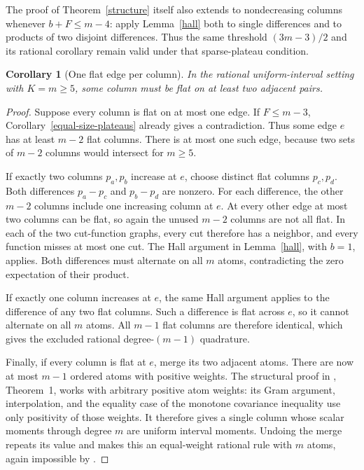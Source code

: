 \documentclass[11pt]{article}
\newtheorem{corollary}[theorem]{Corollary}
\begin{document}
The proof of Theorem~\ref{structure} itself also extends to nondecreasing
columns whenever $b+F\le m-4$: apply Lemma~\ref{hall} both to single
differences and to products of two disjoint differences. Thus the same
threshold $(3m-3)/2$ and its rational corollary remain valid under that
sparse-plateau condition.

\begin{corollary}[One flat edge per column]\label{one-flat}
In the rational uniform-interval setting with $K=m\ge5$, some column
must be flat on at least two adjacent pairs.
\end{corollary}
\begin{proof}
Suppose every column is flat on at most one edge. If $F\le m-3$,
Corollary~\ref{equal-size-plateaus} already gives a contradiction.
Thus some edge $e$ has at least $m-2$ flat columns. There is at most one
such edge, because two sets of $m-2$ columns would intersect for $m\ge5$.

If exactly two columns $p_a,p_b$ increase at $e$, choose distinct flat
columns $p_c,p_d$. Both differences $p_a-p_c$ and $p_b-p_d$ are nonzero.
For each difference, the other $m-2$ columns include one increasing
column at $e$. At every other edge at most two columns can be flat,
so again the unused $m-2$ columns are not all flat.
In each of the two cut-function graphs, every cut therefore has a
neighbor, and every function misses at most one cut. The Hall argument
in Lemma~\ref{hall}, with $b=1$, applies. Both differences must alternate
on all $m$ atoms, contradicting the zero expectation of their product.

If exactly one column increases at $e$, the same Hall argument applies
to the difference of any two flat columns. Such a difference is flat
across $e$, so it cannot alternate on all $m$ atoms. All $m-1$ flat
columns are therefore identical, which gives the excluded rational
degree-$(m-1)$ quadrature.

Finally, if every column is flat at $e$, merge its two adjacent atoms.
There are now at most $m-1$ ordered atoms with positive weights.
The structural proof in , Theorem~1,
works with arbitrary positive atom weights: its Gram argument,
interpolation, and the equality case of the monotone covariance
inequality use only positivity of those weights. It therefore gives
a single column whose scalar moments through degree $m$ are uniform
interval moments. Undoing the merge repeats its value and makes this
an equal-weight rational rule with $m$ atoms, again impossible by
.
\end{proof}
\end{document}

